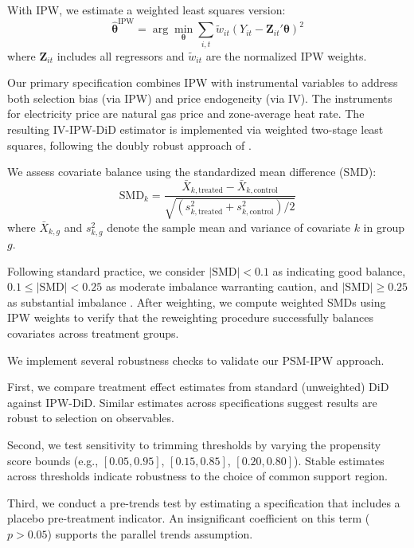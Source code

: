 \documentclass[a4paper,fleqn,longmktitle]{cas-sc}
\begin{document}
With IPW, we estimate a weighted least squares version:
\begin{equation}
    \hat{\boldsymbol{\theta}}^{\text{IPW}} = \arg\min_{\boldsymbol{\theta}} \sum_{i,t} \tilde{w}_{it} \left(Y_{it} - \mathbf{Z}_{it}'\boldsymbol{\theta}\right)^2
\end{equation}
where $\mathbf{Z}_{it}$ includes all regressors and $\tilde{w}_{it}$ are the normalized IPW weights.

Our primary specification combines IPW with instrumental variables to address both selection bias (via IPW) and price endogeneity (via IV). The instruments for electricity price are natural gas price and zone-average heat rate. The resulting IV-IPW-DiD estimator is implemented via weighted two-stage least squares, following the doubly robust approach of \citet{santanna2020doubly}.

We assess covariate balance using the standardized mean difference (SMD):
\begin{equation}
    \text{SMD}_k = \frac{\bar{X}_{k,\text{treated}} - \bar{X}_{k,\text{control}}}{\sqrt{(s^2_{k,\text{treated}} + s^2_{k,\text{control}})/2}}
\end{equation}
where $\bar{X}_{k,g}$ and $s^2_{k,g}$ denote the sample mean and variance of covariate $k$ in group $g$.

Following standard practice, we consider $|\text{SMD}| < 0.1$ as indicating good balance, $0.1 \leq |\text{SMD}| < 0.25$ as moderate imbalance warranting caution, and $|\text{SMD}| \geq 0.25$ as substantial imbalance \citep{austin2011introduction}. After weighting, we compute weighted SMDs using IPW weights to verify that the reweighting procedure successfully balances covariates across treatment groups.

We implement several robustness checks to validate our PSM-IPW approach.

First, we compare treatment effect estimates from standard (unweighted) DiD against IPW-DiD. Similar estimates across specifications suggest results are robust to selection on observables.

Second, we test sensitivity to trimming thresholds by varying the propensity score bounds (e.g., $[0.05, 0.95]$, $[0.15, 0.85]$, $[0.20, 0.80]$). Stable estimates across thresholds indicate robustness to the choice of common support region.

Third, we conduct a pre-trends test by estimating a specification that includes a placebo pre-treatment indicator. An insignificant coefficient on this term ($p > 0.05$) supports the parallel trends assumption.
\end{document}
